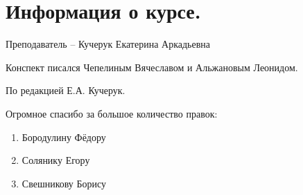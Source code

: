 \chapter{Информация о курсе.}

Преподаватель -- Кучерук Екатерина Аркадьевна

Конспект писался Чепелиным Вячеславом и Альжановым Леонидом. 

По редакцией Е.А. Кучерук.

Огромное спасибо за большое количество правок:

\begin{enumerate}
    \item Бородулину Фёдору 
    \item Солянику Егору 
    \item Свешникову Борису
\end{enumerate}
